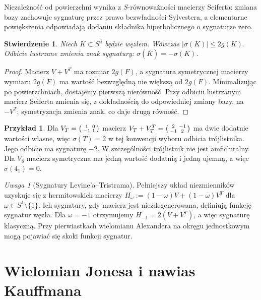 \documentclass[11pt,a4paper]{report}
\numberwithin{equation}{section}
\theoremstyle{plain}
\newtheorem{stwierdzenie}[twierdzenie]{Stwierdzenie}
\theoremstyle{definition}
\newtheorem{przyklad}[twierdzenie]{Przykład}
\theoremstyle{remark}
\newtheorem{uwaga}[twierdzenie]{Uwaga}
\begin{document}
Niezależność od powierzchni wynika z $S$-równoważności macierzy
Seiferta: zmiana bazy zachowuje sygnaturę przez prawo
bezwładności Sylvestera, a elementarne powiększenia odpowiadają
dodaniu składnika hiperbolicznego o sygnaturze zero.

\begin{stwierdzenie}
Niech $K\subset S^3$ będzie węzłem. Wówczas
$|\sigma(K)|\leq2g(K)$.
Odbicie lustrzane zmienia znak sygnatury:
$\sigma(\overline K)=-\sigma(K)$.
\end{stwierdzenie}

\begin{proof}
Macierz $V+V^T$ ma rozmiar $2g(F)$, a sygnatura symetrycznej
macierzy wymiaru $2g(F)$ ma wartość bezwzględną nie większą
od $2g(F)$. Minimalizując po powierzchniach, dostajemy pierwszą
nierówność. Przy odbiciu lustrzanym macierz Seiferta zmienia się,
z dokładnością do odpowiedniej zmiany bazy, na $-V^T$;
symetryzacja zmienia znak, co daje drugą równość.
\end{proof}

\begin{przyklad}
Dla $V_T=\begin{psmallmatrix}1&0\\-1&1\end{psmallmatrix}$
macierz $V_T+V_T^T=\begin{psmallmatrix}2&-1\\-1&2\end{psmallmatrix}$
ma dwie dodatnie wartości własne, więc $\sigma(T)=2$
w tej konwencji wyboru odbicia trójlistnika. Jego odbicie
ma sygnaturę $-2$. W szczególności trójlistnik nie jest
amfichiralny. Dla $V_8$ macierz symetryczna ma jedną wartość
dodatnią i jedną ujemną, a więc $\sigma(4_1)=0$.
\end{przyklad}

\begin{uwaga}[Sygnatury Levine'a--Tristrama]
Pełniejszy układ niezmienników uzyskuje się z hermitowskich
macierzy $H_\omega:=(1-\omega)V+(1-\overline\omega)V^T$
dla $\omega\in S^1\setminus\{1\}$. Ich sygnatury, gdy macierz
jest niezdegenerowana, definiują funkcję sygnatur węzła.
Dla $\omega=-1$ otrzymujemy
$H_{-1}=2(V+V^T)$, a więc sygnaturę klasyczną.
Przy pierwiastkach wielomianu Alexandera na okręgu jednostkowym
mogą pojawiać się skoki funkcji sygnatur.
\end{uwaga}

\section{Wielomian Jonesa i nawias Kauffmana}
\label{sec:kt-jones}
\end{document}
